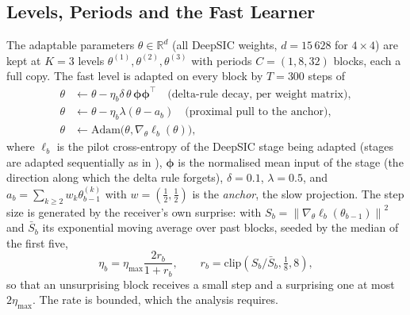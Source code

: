 \documentclass[journal]{IEEEtran}
\newcommand{\norm}[1]{\left\lVert #1 \right\rVert}
\begin{document}
\subsection{Levels, Periods and the Fast Learner}
The adaptable parameters $\theta\in\mathbb{R}^d$ (all DeepSIC weights, $d=15\,628$ for
$4\times4$) are kept at $K=3$ levels $\theta^{(1)},\theta^{(2)},\theta^{(3)}$ with periods
$C=(1,8,32)$ blocks, each a full copy. The fast level is adapted on every block by $T=300$
steps of
\begin{align}
\theta&\leftarrow\theta-\eta_b\delta\,\theta\,\bm\phi\bm\phi^{\!\top}\quad\text{(delta-rule decay, per weight matrix)},\label{eq:delta}\\
\theta&\leftarrow\theta-\eta_b\lambda(\theta-a_b)\quad\text{(proximal pull to the anchor)},\label{eq:prox}\\
\theta&\leftarrow\mathrm{Adam}\big(\theta,\nabla_\theta\ell_b(\theta)\big),\label{eq:adam}
\end{align}
where $\ell_b$ is the pilot cross-entropy of the DeepSIC stage being adapted (stages are
adapted sequentially as in \cite{shlezinger2021}), $\bm\phi$ is the normalised mean input
of the stage (the direction along which the delta rule forgets), $\delta=0.1$,
$\lambda=0.5$, and $a_b=\sum_{k\ge2}w_k\theta^{(k)}_{b-1}$ with $w=(\tfrac12,\tfrac12)$ is
the \emph{anchor}, the slow projection. The step size is generated by the receiver's own
surprise: with $S_b=\norm{\nabla_\theta\ell_b(\theta_{b-1})}^2$ and $\bar S_b$ its
exponential moving average over past blocks, seeded by the median of the first five,
\begin{equation}\label{eq:eta}
\eta_b=\eta_{\max}\frac{2r_b}{1+r_b},\qquad r_b=\mathrm{clip}\!\left(S_b/\bar S_b,\tfrac18,8\right),
\end{equation}
so that an unsurprising block receives a small step and a surprising one at most
$2\eta_{\max}$. The rate is bounded, which the analysis requires.
\end{document}
